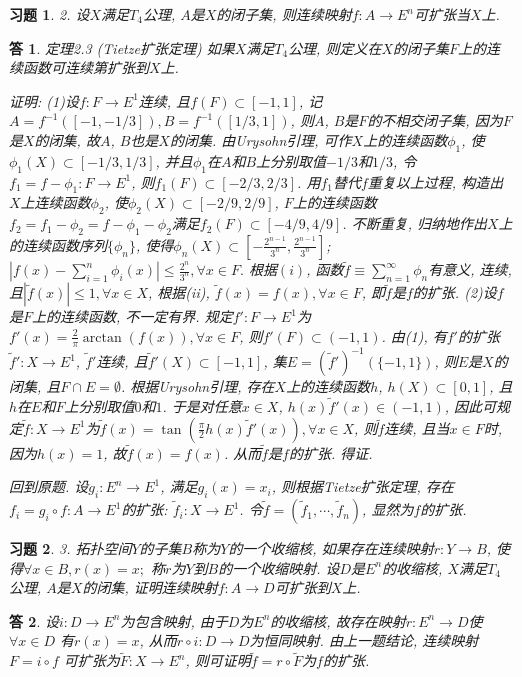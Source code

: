 \documentclass{ctexart}%
\newtheorem*{exercise}{习题}
\newtheorem*{solution}{答}
\theoremstyle{definition}
\theoremstyle{remark}
\begin{document}
\begin{exercise}2. 设$X$满足$T_4$公理, $A$是$X$的闭子集, 则连续映射$f: A\rightarrow E^n$可扩张当$X$上.
\end{exercise}
\begin{solution}
定理2.3 (Tietze扩张定理) 如果$X$满足$T_4$公理, 则定义在$X$的闭子集$F$上的连续函数可连续第扩张到$X$上.

证明: (1)设$f: F\rightarrow E^1$连续, 且$f(F)\subset[-1,1]$, 记$A=f^{-1}([-1,-1/3]), B=f^{-1}([1/3,1])$, 则$A$, $B$是$F$的不相交闭子集, 因为$F$是$X$的闭集, 故$A$, $B$也是$X$的闭集. 由Urysohn引理, 可作$X$上的连续函数$\phi_1$, 使$\phi_1(X)\subset [-1/3,1/3]$, 并且$\phi_1$在$A$和$B$上分别取值$-1/3$和$1/3$, 令$f_1=f-\phi_1: F\rightarrow E^1$, 则$f_1(F)\subset[-2/3,2/3]$. 用$f_1$替代$f$重复以上过程, 构造出$X$上连续函数$\phi_2$, 使$\phi_2(X)\subset[-2/9,2/9]$, $F$上的连续函数$f_2=f_1-\phi_2=f-\phi_1-\phi_2$满足$f_2(F)\subset[-4/9,4/9]$. 不断重复, 归纳地作出$X$上的连续函数序列$\{\phi_n\}$, 使得$\phi_n(X)\subset[-\frac{2^{n-1}}{3^n},\frac{2^{n-1}}{3^n}]$; $|f(x)-\sum_{i=1}^n\phi_i(x)|\leq \frac{2^n}{3^n}, \forall x\in F.$ 根据$(i)$, 函数$\widetilde{f}\equiv \sum_{n=1}^\infty\phi_n$有意义, 连续, 且$|\widetilde{f}(x)|\leq 1, \forall x\in X$, 根据(ii), $\widetilde{f}(x)=f(x),\forall x\in F$, 即$\widetilde{f}$是$f$的扩张. (2)设$f$是$F$上的连续函数, 不一定有界. 规定$f': F\rightarrow E^1$为$f'(x)=\frac{2}{\pi}\arctan (f(x)),\forall x\in F$, 则$f'(F)\subset(-1,1)$. 由(1), 有$f'$的扩张$\widetilde{f}': X\rightarrow E^1$, $\widetilde{f}'$连续, 且$\widetilde{f}'(X)\subset [-1,1]$, 集$E=(\widetilde{f}')^{-1}(\{-1,1\})$, 则$E$是$X$的闭集, 且$F\cap E=\emptyset$. 根据Urysohn引理, 存在$X$上的连续函数$h$, $h(X)\subset[0,1]$, 且$h$在$E$和$F$上分别取值$0$和$1$. 于是对任意$x\in X$, $h(x)\widetilde{f}'(x)\in (-1,1)$, 因此可规定$\widetilde{f}:X\rightarrow E^1$为$\widetilde{f}(x)=\tan(\frac{\pi}{2}h(x)\widetilde{f}'(x)),\forall x\in X$, 则$\widetilde{f}$连续, 且当$x\in F$时, 因为$h(x)=1$, 故$\widetilde{f}(x)=f(x)$. 从而$\widetilde{f}$是$f$的扩张. 得证.

回到原题. 设$g_i: E^n\rightarrow E^1$, 满足$g_i(x)=x_i$, 则根据Tietze扩张定理, 存在$f_i=
g_i\circ f: A\rightarrow E^1$的扩张: $\widetilde{f}_i: X\rightarrow E^1$. 令$\widetilde{f}=(\widetilde{f}_1,\cdots, \widetilde{f}_n)$, 显然为$f$的扩张. 
\end{solution}

\begin{exercise}3. 拓扑空间$Y$的子集$B$称为$Y$的一个收缩核, 如果存在连续映射$r: Y\rightarrow B$, 使得$\forall x\in B, r(x)=x;$ 称$r$为$Y$到$B$的一个收缩映射. 设$D$是$E^n$的收缩核, $X$满足$T_4$公理, $A$是$X$的闭集, 证明连续映射$f:A\rightarrow D$可扩张到$X$上. 
\end{exercise}
\begin{solution}设$i:D\rightarrow E^n$为包含映射, 由于$D$为$E^n$的收缩核, 故存在映射$r:E^n\rightarrow D$使$\forall x\in D$ 有$r(x)=x$, 从而$r\circ i:D\rightarrow D$为恒同映射. 由上一题结论, 连续映射$F=i\circ f$ 可扩张为$\widetilde{F}: X\rightarrow E^n$, 则可证明$\widetilde{f}=r\circ \widetilde{F}$为$f$的扩张. 
\end{solution}
\end{document}
